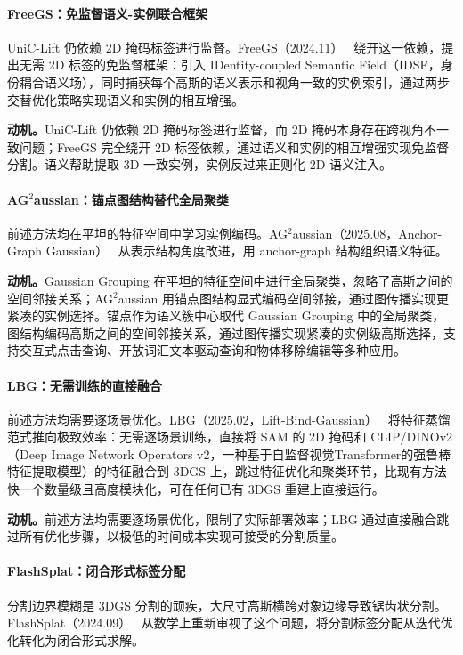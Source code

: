 \paragraph{FreeGS：免监督语义-实例联合框架} UniC-Lift 仍依赖 2D 掩码标签进行监督。FreeGS（2024.11）~\cite{2411_19551} 绕开这一依赖，提出无需 2D 标签的免监督框架：引入 IDentity-coupled Semantic Field（IDSF，身份耦合语义场），同时捕获每个高斯的语义表示和视角一致的实例索引，通过两步交替优化策略实现语义和实例的相互增强。

\textbf{动机。}UniC-Lift 仍依赖 2D 掩码标签进行监督，而 2D 掩码本身存在跨视角不一致问题；FreeGS 完全绕开 2D 标签依赖，通过语义和实例的相互增强实现免监督分割。语义帮助提取 3D 一致实例，实例反过来正则化 2D 语义注入。

\paragraph{AG$^2$aussian：锚点图结构替代全局聚类} 前述方法均在平坦的特征空间中学习实例编码。AG$^2$aussian（2025.08，Anchor-Graph Gaussian）~\cite{2508_01740} 从表示结构角度改进，用 anchor-graph 结构组织语义特征。

\textbf{动机。}Gaussian Grouping 在平坦的特征空间中进行全局聚类，忽略了高斯之间的空间邻接关系；AG$^2$aussian 用锚点图结构显式编码空间邻接，通过图传播实现更紧凑的实例选择。锚点作为语义簇中心取代 Gaussian Grouping 中的全局聚类，图结构编码高斯之间的空间邻接关系，通过图传播实现紧凑的实例级高斯选择，支持交互式点击查询、开放词汇文本驱动查询和物体移除编辑等多种应用。

\paragraph{LBG：无需训练的直接融合} 前述方法均需要逐场景优化。LBG（2025.02，Lift-Bind-Gaussian）~\cite{2502_00173} 将特征蒸馏范式推向极致效率：无需逐场景训练，直接将 SAM 的 2D 掩码和 CLIP/DINOv2（Deep Image Network Operators v2，一种基于自监督视觉Transformer的强鲁棒特征提取模型）的特征融合到 3DGS 上，跳过特征优化和聚类环节，比现有方法快一个数量级且高度模块化，可在任何已有 3DGS 重建上直接运行。

\textbf{动机。}前述方法均需要逐场景优化，限制了实际部署效率；LBG 通过直接融合跳过所有优化步骤，以极低的时间成本实现可接受的分割质量。

\paragraph{FlashSplat：闭合形式标签分配} 分割边界模糊是 3DGS 分割的顽疾，大尺寸高斯横跨对象边缘导致锯齿状分割。FlashSplat（2024.09）~\cite{2409_08270} 从数学上重新审视了这个问题，将分割标签分配从迭代优化转化为闭合形式求解。


